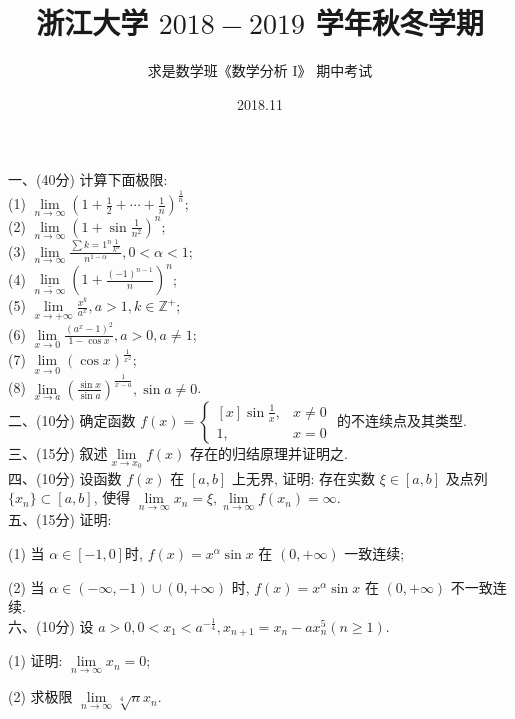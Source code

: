 \documentclass[UTF8]{ctexart}
\title{\LARGE \textbf{浙江大学 $2018-2019$ 学年秋冬学期}}
\author{求是数学班《数学分析 I》 期中考试}
\date{2018.11}
\begin{document}
\maketitle

一、(40分) 计算下面极限:
\\

(1) $\displaystyle\lim\limits_{n\to\infty}\left(1+\frac{1}{2}+\cdots+\frac{1}{n}\right)^\frac{1}{n}$;
\\

(2) $\displaystyle\lim\limits_{n\to\infty}\left(1+\sin\frac{1}{n^2}\right)^n$;
\\

(3) $\displaystyle\lim\limits_{n\to\infty}\frac{\sum{k=1}^{n}\frac{1}{k^{\alpha}}}{n^{1-\alpha}},0<\alpha<1$;
\\

(4) $\displaystyle\underset{n\to\infty}{\underline{\lim}}\left(1+\frac{(-1)^{n-1}}{n} \right)^n$;
\\

(5) $\displaystyle\lim\limits_{x\to+\infty}\frac{x^k}{a^x},a>1,k\in\mathbb{Z}^+$;
\\

(6) $\displaystyle\lim\limits_{x\to0}\frac{\left(a^x-1\right)^2}{1-\cos x},a>0,a\neq1$;
\\

(7) $\displaystyle\lim\limits_{x\to0}\left(\cos x\right)^{\frac{1}{x^2}}$;
\\

(8) $\displaystyle\lim\limits_{x\to a}\left(\frac{\sin x}{\sin a}\right)^{\frac{1}{x-a}},\sin a\neq0$.
\\

二、(10分) 确定函数 $f(x)=\begin{cases}
\displaystyle[x]\sin\frac{1}{x},&x\neq0\\
1, &x=0
\end{cases}$
的不连续点及其类型.
\\

三、(15分) 叙述$\displaystyle\lim\limits_{x\to x_0}f(x)$ 存在的归结原理并证明之.
\\

四、(10分) 设函数 $f(x)$ 在 $[a,b]$ 上无界, 证明: 存在实数 $\xi\in[a,b]$ 及点列 $\{x_n\}\subset [a,b]$, 使得 $\displaystyle\lim\limits_{n\to\infty}x_n=\xi,\lim\limits_{n\to\infty}f(x_n)=\infty$.
\\

五、(15分) 证明:

(1) 当 $\alpha\in[-1,0]$时, $f(x)=x^{\alpha}\sin x$ 在 $(0,+\infty)$ 一致连续;

(2) 当 $\alpha\in(-\infty,-1)\cup(0,+\infty)$ 时, $f(x)=x^{\alpha}\sin x$ 在 $(0,+\infty)$ 不一致连续.
\\

六、(10分) 设 $\displaystyle a>0,0<x_1<a^{-\frac{1}{4}},x_{n+1}=x_n-ax_n^5(n\geq1)$.

(1) 证明: $\lim\limits_{n\to\infty}x_n=0$;

(2) 求极限 $\lim\limits_{n\to\infty}\sqrt[4]{n}x_n$.
\end{document}

